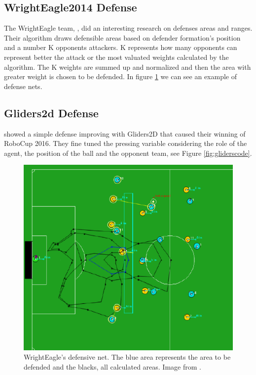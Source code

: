 \subsection{WrightEagle2014 Defense}
The WrightEagle team, \cite{wrighteagle2014}, did an interesting research on defenses areas and ranges. Their algorithm draws defensible areas based on defender formation's position and a number K opponents attackers. K represents how many opponents can represent better the attack or the most valuated weights calculated by the algorithm. The K weights are summed up and normalized and then the area with greater weight is chosen to be defended. In figure \ref{fig:defensenet} we can see an example of defense nets.

\subsection{Gliders2d Defense}
\cite{glidersv1} showed a simple defense improving with Gliders2D that caused their winning of RoboCup 2016. They fine tuned the pressing variable considering the role of the agent, the position of the ball and the opponent team, see Figure \ref{fig:gliderscode}. 

\begin{figure}[H]
    \centering
    \includegraphics[scale=0.45]{images/wrightEagle_defensenet.png}
    \caption{WrightEagle's defensive net. The blue area represents the area to be defended and the blacks, all calculated areas. Image from \cite{wrighteagle2014}.}
    \label{fig:defensenet}
\end{figure}


